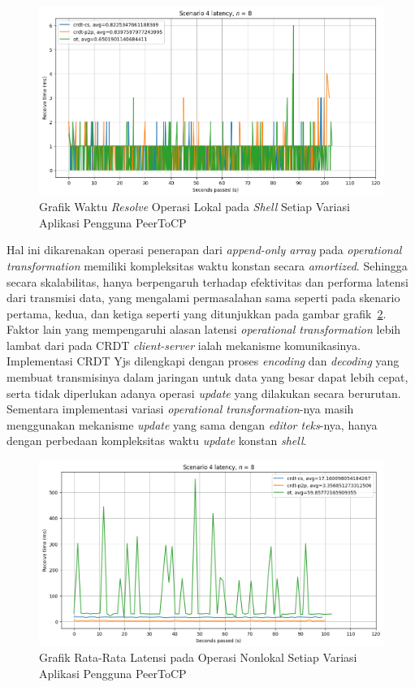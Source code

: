 \begin{figure}
 \centering
 \includegraphics[width=15cm]{./assets/skripsi/benchmark-vis_cell_13_output_5}
 \caption{Grafik Waktu \textit{Resolve} Operasi Lokal pada \textit{Shell} Setiap Variasi Aplikasi Pengguna PeerToCP}
 \label{fig:13-5}
\end{figure}

Hal ini dikarenakan operasi penerapan dari \textit{append-only array} pada \textit{operational transformation} memiliki kompleksitas waktu konstan secara \textit{amortized}. Sehingga secara skalabilitas, hanya berpengaruh terhadap efektivitas dan performa latensi dari transmisi data, yang mengalami permasalahan sama seperti pada skenario pertama, kedua, dan ketiga seperti yang ditunjukkan pada gambar grafik~\ref{fig:9-5}. Faktor lain yang mempengaruhi alasan latensi \textit{operational transformation} lebih lambat dari pada CRDT \textit{client-server} ialah mekanisme komunikasinya. Implementasi CRDT Yjs dilengkapi dengan proses \textit{encoding} dan \textit{decoding} yang membuat transmisinya dalam jaringan untuk data yang besar dapat lebih cepat, serta tidak diperlukan adanya operasi \textit{update} yang dilakukan secara berurutan. Sementara implementasi variasi \textit{operational transformation}-nya masih menggunakan mekanisme \textit{update} yang sama dengan \textit{editor teks}-nya, hanya dengan perbedaan kompleksitas waktu \textit{update} konstan \textit{shell}.

\begin{figure}
 \centering
 \includegraphics[width=15cm]{./assets/skripsi/benchmark-vis_cell_9_output_5}
 \caption{Grafik Rata-Rata Latensi pada Operasi Nonlokal Setiap Variasi Aplikasi Pengguna PeerToCP}
 \label{fig:9-5}
\end{figure}

